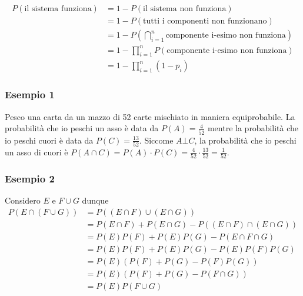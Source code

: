 \documentclass[11pt]{report}
\begin{document}
\begin{enumerate}
    \begin{equation}
        \begin{split}
            P(\text{il sistema funziona}) & = 1 - P(\text{il sistema non funziona})\\
            & = 1 - P(\text{tutti i componenti non funzionano})\\
            & = 1 - P\left( \bigcap_{i=1}^{n}\text{componente i-esimo non funziona} \right)\\
            & = 1 - \prod_{i=1}^{n}P(\text{componente i-esimo non funziona})\\
            & = 1 - \prod_{i=1}^{n}(1 - p_i)
        \end{split}
    \end{equation}
\end{enumerate}
\subsubsection{Esempio 1}
Pesco una carta da un mazzo di 52 carte mischiato in maniera equiprobabile. La probabilità che io peschi un asso è data da $P(A) = \frac{4}{52}$ mentre la probabilità che io peschi cuori è data da $P(C) = \frac{13}{52}$. Siccome $A \bot C$, la probabilità che io peschi un asso di cuori è $P(A \cap C) = P(A) \cdot P(C) = \frac{4}{52} \cdot \frac{13}{52} = \frac{1}{52}$.
\subsubsection{Esempio 2}
Considero $E$ e $F \cup G$ dunque
\begin{equation}
    \begin{split}
        P(E \cap (F \cup G)) & = P((E \cap F) \cup (E \cap G))\\
        & = P(E \cap F) + P(E \cap G) - P((E \cap F) \cap (E \cap G))\\
        & = P(E)P(F) + P(E)P(G) - P(E \cap F \cap G)\\
        & = P(E)P(F) + P(E)P(G) - P(E)P(F)P(G)\\
        & = P(E)(P(F) + P(G) - P(F)P(G))\\
        & = P(E)(P(F) + P(G) - P(F \cap G))\\
        & = P(E)P(F \cup G)
    \end{split}
\end{equation}
\end{document}
